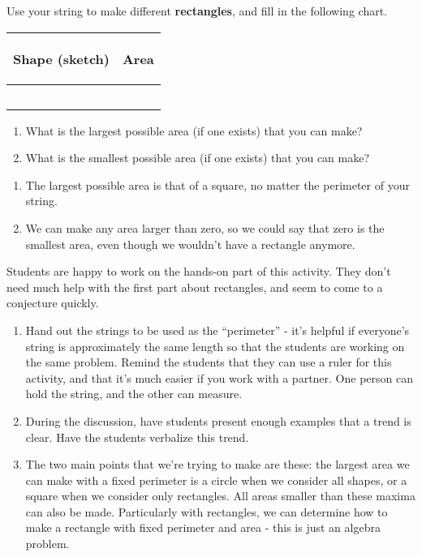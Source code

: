\documentclass{ximera}
\begin{document}
\begin{problem} Use your string to make different {\bf rectangles}, and fill in the following chart.
\vskip 0.1in
\begin{tabular}{|p{2.2in}|p{2.2in}|}
\hline
\begin{center} Shape (sketch) \end{center} & \begin{center} Area \end{center}  \\ \hline
 & \\ [10ex] \hline
 & \\ [10 ex] \hline
 & \\ [10 ex] \hline
 & \\ [10 ex] \hline
 & \\ [10 ex] \hline
\end{tabular}
\begin{enumerate}

\item What is the largest possible area (if one exists) that you can make?
\item What is the smallest possible area (if one exists) that you can make?
\end{enumerate}

\begin{solution}
\begin{enumerate}
\item The largest possible area is that of a square, no matter the perimeter of your string.
\item We can make any area larger than zero, so we could say that zero is the smallest area, even though we wouldn't have a rectangle anymore.
\end{enumerate}
\end{solution}

\begin{instructorNotes}
Students are happy to work on the hands-on part of this activity.  They don't need much help with the first part about rectangles, and seem to come to a conjecture quickly.
\begin{enumerate}
\item Hand out the strings to be used as the ``perimeter'' - it's helpful if everyone's string is approximately the same length so that the students are working on the same problem.  Remind the students that they can use a ruler for this activity, and that it's much easier if you work with a partner.  One person can hold the string, and the other can measure.
	\item During the discussion, have students present enough examples that a trend is clear.  Have the students verbalize this trend.
	\item The two main points that we're trying to make are these: the largest area we can make with a fixed perimeter is a circle when we consider all shapes, or a square when we consider only rectangles.  All areas smaller than these maxima can also be made.  Particularly with rectangles, we can determine how to make a rectangle with fixed perimeter and area - this is just an algebra problem.


\end{enumerate}
\end{instructorNotes}
\end{problem}
\end{document}
